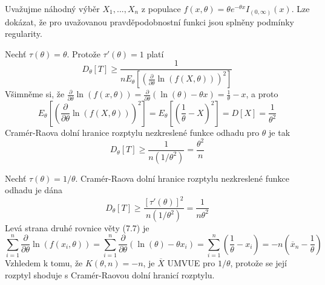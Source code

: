 \begin{example}
Uvažujme náhodný výběr $X_1, ..., X_n$ z populace $f(x, \theta) = \theta e^{-\theta x}I_{(0, \infty)}(x)$. Lze dokázat, že pro uvažovanou pravděpodobnostní funkci jsou splněny podmínky regularity.

Nechť $\tau(\theta) = \theta$. Protože $\tau'(\theta) = 1$ platí
\begin{equation*}
D_{\theta}[T] \ge \frac{1}{nE_{\theta}\left[\left(\frac{\partial}{\partial \theta} \ln \left(f(X, \theta)\right)\right)^2\right]}
\end{equation*}
Všimněme si, že $\frac{\partial}{\partial \theta} \ln \left(f(x, \theta) \right) = \frac{\partial}{\partial \theta}(\ln(\theta) - \theta x) = \frac{1}{\theta} - x$, a proto
\begin{equation*}
E_{\theta}[\left(\frac{\partial}{\partial \theta} \ln \left(f(X, \theta)\right)\right)^2] = E_{\theta}\left[\left(\frac{1}{\theta} - X\right)^2\right] = D[X] = \frac{1}{\theta^2}
\end{equation*}
Cramér-Raova dolní hranice rozptylu nezkreslené funkce odhadu pro $\theta$ je tak
\begin{equation*}
D_{\theta}[T] \ge \frac{1}{n(1 / \theta^2)} = \frac{\theta^2}{n}
\end{equation*}

Nechť $\tau(\theta) = 1/\theta$. Cramér-Raova dolní hranice rozptylu nezkreslené funkce odhadu je dána
\begin{equation*}
D_{\theta}[T] \ge \frac{[\tau'(\theta)]^2}{n(1/\theta^2)} = \frac{1}{n \theta^2}
\end{equation*}
Levá strana druhé rovnice věty (7.7) je
\begin{equation*}
\sum_{i = 1}^n \frac{\partial}{\partial \theta}\ln \left(f(x_i, \theta) \right) = \sum_{i = 1}^n \frac{\partial}{\partial \theta}\left(\ln(\theta) - \theta x_i \right) = \sum_{i = 1}^n \left(\frac{1}{\theta} - x_i \right) = -n \left(\overline{x}_n - \frac{1}{\theta}\right)
\end{equation*}
Vzhledem k tomu, že $K(\theta, n) = -n$, je $\overline{X}$ UMVUE pro $1/\theta$, protože se její rozptyl shoduje s Cramér-Raovou dolní hranicí rozptylu.
\end{example}

